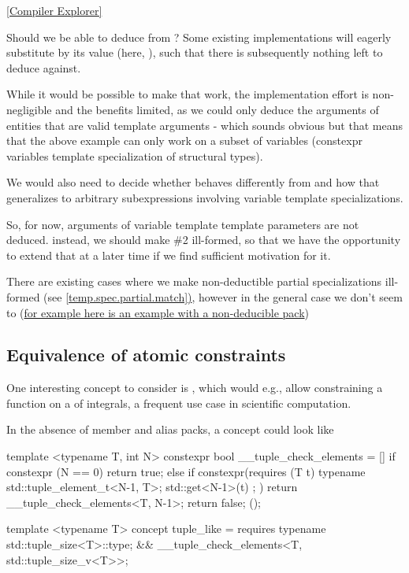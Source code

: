 \documentclass{wg21}
\begin{document}
\href{https://godbolt.org/z/sqTfEojh4}{[Compiler Explorer]}


Should we be able to deduce  from ?
Some existing implementations will eagerly substitute  by its value (here, ),
such that there is subsequently nothing left to deduce  against.

While it would be possible to make that work, the implementation effort is non-negligible and the benefits limited,
as we could only deduce the arguments of entities that are valid template arguments - which sounds obvious but that means that the
above example can only work on a subset of variables (constexpr variables template specialization of structural types).

We would also need to decide whether  behaves differently from 
and how that generalizes to arbitrary subexpressions involving variable template specializations.

So, for now, arguments of variable template template parameters are not deduced.
instead, we should make \#2 ill-formed, so that we have the opportunity to extend that at a later time if we find sufficient motivation for it.

There are existing cases where we make non-deductible partial specializations ill-formed (see \href{https://eel.is/c++draft/temp.spec.partial#match-3}{[temp.spec.partial.match])},
however in the general case we don't seem to (\href{https://gcc.godbolt.org/z/fv1e8nnsf}{for example here is an example with a non-deducible pack})


\subsection{Equivalence of atomic constraints}

One interesting concept to consider is , which would e.g., allow constraining a function on a 
of integrals, a frequent use case in scientific computation.

In the absence of member and alias packs, a  concept could look like

\begin{colorblock}
template <typename T, int N>
constexpr bool __tuple_check_elements = [] {
    if constexpr (N == 0)
      return true;
    else if constexpr(requires (T t) {
        typename std::tuple_element_t<N-1, T>;
        { std::get<N-1>(t) };
    })
      return  __tuple_check_elements<T, N-1>;
    return false;
}();

template <typename T>
concept tuple_like = requires {
    typename std::tuple_size<T>::type;
} &&  __tuple_check_elements<T, std::tuple_size_v<T>>;
\end{colorblock}
\end{document}
